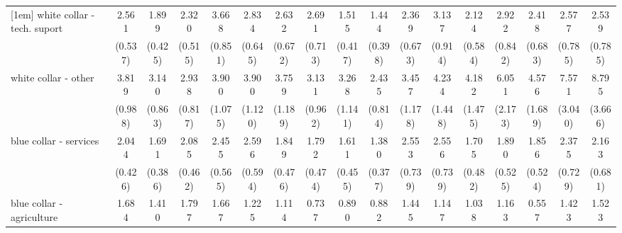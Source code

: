 {\begin{tabular}{l*{16}{c}}
[1em]
white collar - tech. suport&       2.561\sym{***}&       1.899\sym{**} &       2.320\sym{***}&       3.668\sym{***}&       2.834\sym{***}&       2.632\sym{***}&       2.691\sym{***}&       1.515         &       1.444         &       2.369\sym{**} &       3.137\sym{***}&       2.124\sym{**} &       2.922\sym{***}&       2.418\sym{**} &       2.577\sym{**} &       2.539\sym{**} \\
                    &     (0.537)         &     (0.425)         &     (0.515)         &     (0.851)         &     (0.645)         &     (0.672)         &     (0.713)         &     (0.417)         &     (0.398)         &     (0.673)         &     (0.914)         &     (0.584)         &     (0.842)         &     (0.683)         &     (0.785)         &     (0.785)         \\
[1em]
white collar - other&       3.819\sym{***}&       3.140\sym{***}&       2.938\sym{***}&       3.900\sym{***}&       3.900\sym{***}&       3.759\sym{***}&       3.131\sym{***}&       3.268\sym{***}&       2.435\sym{**} &       3.457\sym{***}&       4.234\sym{***}&       4.182\sym{***}&       6.051\sym{***}&       4.576\sym{***}&       7.571\sym{***}&       8.795\sym{***}\\
                    &     (0.988)         &     (0.863)         &     (0.817)         &     (1.075)         &     (1.120)         &     (1.189)         &     (0.962)         &     (1.141)         &     (0.814)         &     (1.178)         &     (1.448)         &     (1.475)         &     (2.173)         &     (1.689)         &     (3.040)         &     (3.666)         \\
[1em]
blue collar - services&       2.044\sym{***}&       1.691\sym{*}  &       2.085\sym{***}&       2.455\sym{***}&       2.596\sym{***}&       1.849\sym{*}  &       1.792\sym{*}  &       1.611         &       1.380         &       2.553\sym{**} &       2.556\sym{**} &       1.705         &       1.890\sym{*}  &       1.856\sym{*}  &       2.375\sym{**} &       2.163\sym{*}  \\
                    &     (0.426)         &     (0.386)         &     (0.462)         &     (0.565)         &     (0.594)         &     (0.476)         &     (0.474)         &     (0.455)         &     (0.377)         &     (0.739)         &     (0.739)         &     (0.482)         &     (0.525)         &     (0.524)         &     (0.729)         &     (0.681)         \\
[1em]
blue collar - agriculture&       1.684         &       1.410         &       1.797         &       1.667         &       1.225         &       1.114         &       0.737         &       0.890         &       0.882         &       1.445         &       1.147         &       1.038         &       1.163         &       0.557         &       1.423         &       1.523         \\

\end{tabular}}
